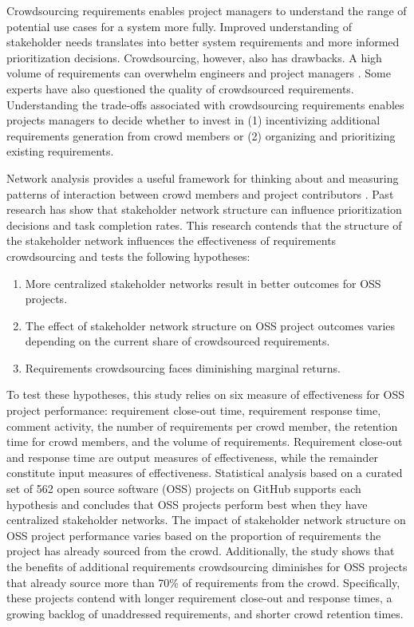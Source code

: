 Crowdsourcing requirements enables project managers to understand the range of potential use cases for a system more fully. Improved understanding of stakeholder needs translates into better system requirements and more informed prioritization decisions. Crowdsourcing, however, also has drawbacks. A high volume of requirements can overwhelm engineers and project managers \cite{groen}. Some experts \cite{snijders} have also questioned the quality of crowdsourced requirements. Understanding the trade-offs associated with crowdsourcing requirements enables projects managers to decide whether to invest in (1) incentivizing additional requirements generation from crowd members or (2) organizing and prioritizing existing requirements.

Network analysis provides a useful framework for thinking about and measuring patterns of interaction between crowd members and project contributors \cite{wood}. Past research \cite{wood, linaker} has show that stakeholder network structure can influence prioritization decisions and task completion rates. This research contends that the structure of the stakeholder network influences the effectiveness of requirements crowdsourcing and tests the following hypotheses:

\begin{enumerate}
    \item More centralized stakeholder networks result in better outcomes for OSS projects.
    \item The effect of stakeholder network structure on OSS project outcomes varies depending on the current share of crowdsourced requirements.
    \item Requirements crowdsourcing faces diminishing marginal returns.
\end{enumerate}

To test these hypotheses, this study relies on six measure of effectiveness for OSS project performance: requirement close-out time, requirement response time, comment activity, the number of requirements per crowd member, the retention time for crowd members, and the volume of requirements. Requirement close-out and response time are output measures of effectiveness, while the remainder constitute input measures of effectiveness. Statistical analysis based on a curated set of 562 open source software (OSS) projects on GitHub supports each hypothesis and concludes that OSS projects perform best when they have centralized stakeholder networks. The impact of stakeholder network structure on OSS project performance varies based on the proportion of requirements the project has already sourced from the crowd. Additionally, the study shows that the benefits of additional requirements crowdsourcing diminishes for OSS projects that already source more than 70\% of requirements from the crowd. Specifically, these projects contend with longer requirement close-out and response times, a growing backlog of unaddressed requirements, and shorter crowd retention times.

